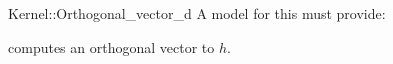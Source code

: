 \begin{ccRefFunctionObjectConcept}{Kernel::Orthogonal_vector_d}
A model for this must provide:


{computes an orthogonal vector to $h$.}

\end{ccRefFunctionObjectConcept}
